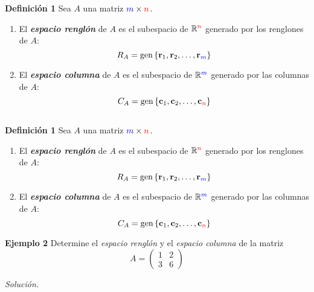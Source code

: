 {\begin{frame}
\begin{defi}{\textbf{Definición 1}}
	Sea $A$ una matriz ${\color{blue}m}\times {\color{red}n}$.
	\begin{enumerate}
		\item[\labelname{$a$}] El \textbf{\textit{espacio renglón}} de $A$ es el subespacio de $\mathbb{R}^{\color{red}n}$ generado por los renglones de $A$:
		\[
			R_A = \text{gen}\, \{ \mathbf{r}_1, \mathbf{r}_2, \hdots,\mathbf{r}_{\color{blue}m} \}
		\]
		\item[\labelname{$b$}] El \textbf{\textit{espacio columna}} de $A$ es el subespacio de $\mathbb{R}^{\color{blue}m}$ generado por las columnas de $A$:
		\[
			C_A = \text{gen}\, \{ \mathbf{c}_1, \mathbf{c}_2, \hdots,\mathbf{c}_{\color{red}n} \}
		\]
	\end{enumerate}
\end{defi}	

\end{frame}
}


\subsection{}

{\nologo
\begin{frame}%

\begin{defi}{\textbf{Definición 1}}
	Sea $A$ una matriz ${\color{blue}m}\times {\color{red}n}$.
	\begin{enumerate}
		\item[\labelname{$a$}] El \textbf{\textit{espacio renglón}} de $A$ es el subespacio de $\mathbb{R}^{\color{red}n}$ generado por los renglones de $A$:
		\[
		R_A = \text{gen}\, \{ \mathbf{r}_1, \mathbf{r}_2, \hdots,\mathbf{r}_{\color{blue}m} \}
		\]
		\item[\labelname{$b$}] El \textbf{\textit{espacio columna}} de $A$ es el subespacio de $\mathbb{R}^{\color{blue}m}$ generado por las columnas de $A$:
		\[
		C_A = \text{gen}\, \{ \mathbf{c}_1, \mathbf{c}_2, \hdots,\mathbf{c}_{\color{red}n} \}
		\]
	\end{enumerate}
\end{defi}	


\begin{ej}{\textbf{Ejemplo  2}}
	Determine el \textit{espacio renglón} y el \textit{espacio columna} de la matriz
		\[
		A = 
		\left( 
		\begin{array}{cc}	
		1 & 2 \\ 
		3 & 6 
		\end{array} 
		\right)
		\]
\end{ej}
\textit{Solución.}

\end{frame}
}

